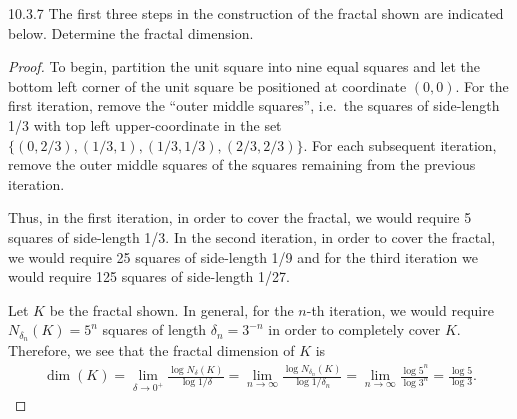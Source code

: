 \begin{problem}{10.3.7}
  The first three steps in the construction of the fractal shown are indicated below.
  Determine the fractal dimension.
\end{problem}

\begin{proof}
  To begin, partition the unit square into nine equal squares and
  let the bottom left corner of the unit square be positioned at coordinate $(0, 0)$. For the first
  iteration, remove
  the ``outer middle squares'', i.e.\ the squares of side-length 1/3 with top left upper-coordinate in the set
  $\{(0, 2/3), (1/3, 1), (1/3, 1/3), (2/3, 2/3)\}$. For each subsequent iteration, remove the outer middle squares of the
  squares remaining from the previous iteration.

  Thus, in the first iteration, in order to cover the fractal, we would require 5 squares of side-length 1/3.
  In the second iteration, in order to cover the fractal, we would require 25 squares of side-length 1/9
  and for the third iteration we would require 125 squares of side-length 1/27.

  Let $K$ be the fractal shown. In general, for the $n$-th iteration, we would require $N_{\delta_n}(K) = 5^n$
  squares of length $\delta_n = 3^{-n}$ in order to completely cover $K$. Therefore, we see that the fractal dimension of $K$ is
  \begin{align*}
    \dim(K) = \lim_{\delta \to 0^+} \frac{\log N_\delta(K)}{\log 1/\delta} = \lim_{n\to\infty}\frac{\log N_{\delta_n}(K)}{\log 1/\delta_n} = \lim_{n\to\infty}\frac{\log 5^n}{\log 3^n} = \frac{\log 5}{\log 3}.
  \end{align*}
\end{proof}
\newpage
